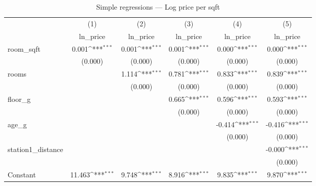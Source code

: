 \begin{table}[H]\centering
\def\sym#1{\ifmmode^{#1}\else\(^{#1}\)\fi}
\caption{Simple regressions — Log price per sqft}
\begin{tabular}{l*{5}{c}}
\toprule
                    &\multicolumn{1}{c}{(1)}&\multicolumn{1}{c}{(2)}&\multicolumn{1}{c}{(3)}&\multicolumn{1}{c}{(4)}&\multicolumn{1}{c}{(5)}\\
                    &\multicolumn{1}{c}{ln\_price}&\multicolumn{1}{c}{ln\_price}&\multicolumn{1}{c}{ln\_price}&\multicolumn{1}{c}{ln\_price}&\multicolumn{1}{c}{ln\_price}\\
\midrule
room\_sqft           &       0.001\sym{***}&       0.001\sym{***}&       0.001\sym{***}&       0.000\sym{***}&       0.000\sym{***}\\
                    &     (0.000)         &     (0.000)         &     (0.000)         &     (0.000)         &     (0.000)         \\
\addlinespace
rooms               &                     &       1.114\sym{***}&       0.781\sym{***}&       0.833\sym{***}&       0.839\sym{***}\\
                    &                     &     (0.000)         &     (0.000)         &     (0.000)         &     (0.000)         \\
\addlinespace
floor\_g             &                     &                     &       0.665\sym{***}&       0.596\sym{***}&       0.593\sym{***}\\
                    &                     &                     &     (0.000)         &     (0.000)         &     (0.000)         \\
\addlinespace
age\_g               &                     &                     &                     &      -0.414\sym{***}&      -0.416\sym{***}\\
                    &                     &                     &                     &     (0.000)         &     (0.000)         \\
\addlinespace
station1\_distance   &                     &                     &                     &                     &      -0.000\sym{***}\\
                    &                     &                     &                     &                     &     (0.000)         \\
\addlinespace
Constant            &      11.463\sym{***}&       9.748\sym{***}&       8.916\sym{***}&       9.835\sym{***}&       9.870\sym{***}\\

\end{tabular}
\end{table}
